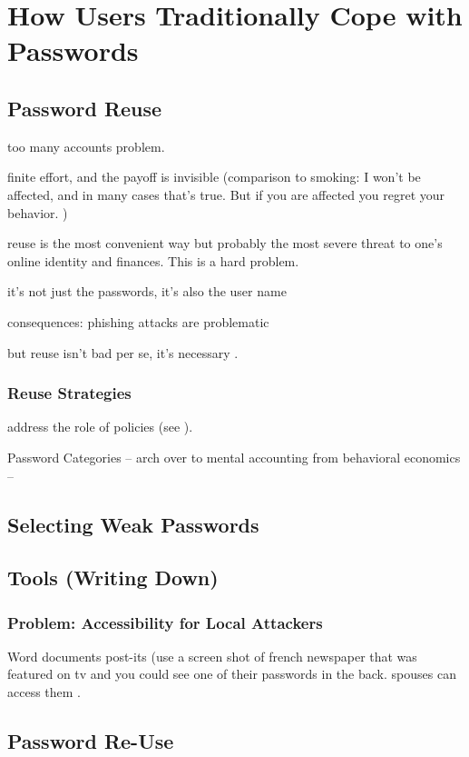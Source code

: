 	
	
\section{How Users Traditionally Cope with Passwords}
	\subsection{Password Reuse}
	too many accounts problem. 
	
	finite effort, and the payoff is invisible (comparison to smoking: I won't be affected, and in many cases that's true. But if you are affected you regret your behavior. )
	
	reuse is the most convenient way but probably the most severe threat to one's online identity and finances. This is a hard problem. 
	
	it's not just the passwords, it's also the user name 
	
	consequences: phishing attacks are problematic
	
	but reuse isn't bad per se, it's necessary \cite{Florencio2014PasswordPortfoliosFiniteUser}. 
	
	
	\subsubsection{Reuse Strategies}
	address the role of policies (see \cite{Seitz2017PoliciesReuse}).
	
	Password Categories -- arch over to mental accounting from behavioral economics -- \cite{Thaler2004}
	

	
	
	\subsection{Selecting Weak Passwords}
	
	\subsection{Tools (Writing Down)}
		\subsubsection{Problem: Accessibility for Local Attackers}
Word documents post-its (use a screen shot of french newspaper that was featured on tv and you could see one of their passwords in the back. spouses can access them .

	\subsection{Password Re-Use}
